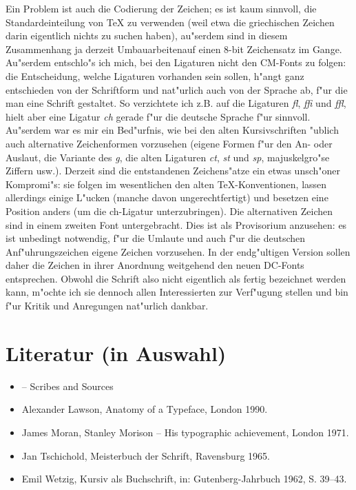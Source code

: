 \documentclass[draft,12pt,a4paper,german]{article}
\begin{document}
Ein Problem ist auch die Codierung der Zeichen; es ist kaum sinnvoll, die
Standardeinteilung von  \TeX{} zu verwenden (weil etwa die griechischen
Zeichen darin eigentlich nichts zu suchen haben), au"serdem sind in diesem
Zusammenhang ja derzeit \glqq Umbauarbeiten\grqq  auf einen 8-bit Zeichensatz im
Gange. Au"serdem entschlo"s ich mich, bei den Ligaturen nicht den CM-Fonts zu
folgen: die Entscheidung, welche Ligaturen vorhanden sein sollen, h"angt ganz
entschieden von der Schriftform und nat"urlich auch von der Sprache ab, f"ur
die man eine Schrift gestaltet. So verzichtete ich z.B. auf die Ligaturen
\emph{fl}, \emph{ffi} und \emph{ffl}, hielt aber eine Ligatur \emph{ch} gerade
f"ur die deutsche Sprache f"ur sinnvoll. Au"serdem war es mir ein Bed"urfnis,
wie bei den alten Kursivschriften "ublich auch alternative Zeichenformen
vorzusehen (eigene Formen f"ur den An- oder Auslaut, die Variante des \emph{g},
die alten Ligaturen \emph{ct}, \emph{st} und \emph{sp}, majuskelgro"se Ziffern  
usw.). Derzeit sind die entstandenen Zeichens"atze ein etwas unsch"oner
Kompromi"s: sie folgen im wesentlichen den alten \TeX-Konventionen, lassen
allerdings einige L"ucken (manche davon ungerechtfertigt) und besetzen eine
Position anders (um die ch-Ligatur unterzubringen). Die alternativen Zeichen
sind in einem zweiten Font untergebracht. Dies ist als Provisorium
anzusehen: es ist unbedingt notwendig, f"ur die Umlaute und auch f"ur die
deutschen Anf"uhrungszeichen eigene Zeichen vorzusehen. In der
\glqq endg"ultigen\grqq 
Version sollen daher die Zeichen in ihrer Anordnung weitgehend den neuen
DC-Fonts entsprechen. Obwohl die Schrift also nicht eigentlich als 
\glqq fertig\grqq 
bezeichnet werden kann, m"ochte ich sie dennoch allen Interessierten zur
Verf"ugung stellen und bin f"ur Kritik und Anregungen nat"urlich dankbar.

\section{Literatur (in Auswahl)}
\begin{itemize}
\item -- Scribes and Sources

\item  Alexander Lawson, Anatomy of a Typeface, London 1990.
 
\item  James Moran, Stanley Morison -- His typographic achievement, London 1971.
 
\item  Jan Tschichold, Meisterbuch der Schrift, Ravensburg 1965.
 
\item  Emil Wetzig, Kursiv als Buchschrift, in: Gutenberg-Jahrbuch 1962,
       S. 39--43.

\end{itemize}
\end{document}
